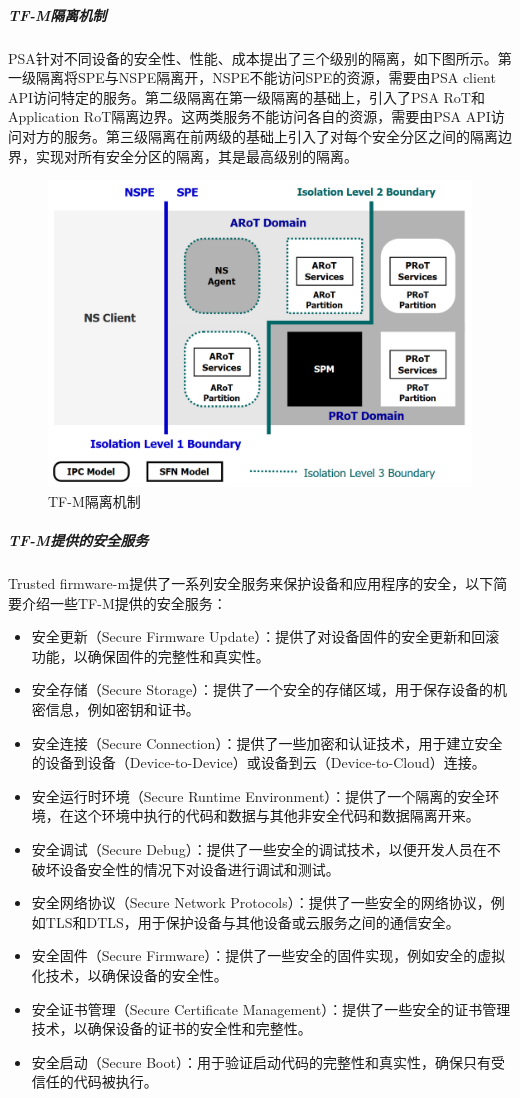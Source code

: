 \documentclass[12pt,a4paper]{ctexart}
\numberwithin{figure}{section}
\begin{document}
\subparagraph{TF-M隔离机制}
\par PSA针对不同设备的安全性、性能、成本提出了三个级别的隔离，如下图所示。第一级隔离将SPE与NSPE隔离开，NSPE不能访问SPE的资源，需要由PSA client API访问特定的服务。第二级隔离在第一级隔离的基础上，引入了PSA RoT和Application RoT隔离边界。这两类服务不能访问各自的资源，需要由PSA API访问对方的服务。第三级隔离在前两级的基础上引入了对每个安全分区之间的隔离边界，实现对所有安全分区的隔离，其是最高级别的隔离。
\begin{figure}
    \centering
    \includegraphics[scale=0.27]{graph/isolation.png}
    \caption{TF-M隔离机制}
\end{figure}
\subparagraph{TF-M提供的安全服务}
\par Trusted firmware-m提供了一系列安全服务来保护设备和应用程序的安全，以下简要介绍一些TF-M提供的安全服务：
\begin{itemize}
    \item 安全更新（Secure Firmware Update）：提供了对设备固件的安全更新和回滚功能，以确保固件的完整性和真实性。
    \item 安全存储（Secure Storage）：提供了一个安全的存储区域，用于保存设备的机密信息，例如密钥和证书。
    \item 安全连接（Secure Connection）：提供了一些加密和认证技术，用于建立安全的设备到设备（Device-to-Device）或设备到云（Device-to-Cloud）连接。
    \item 安全运行时环境（Secure Runtime Environment）：提供了一个隔离的安全环境，在这个环境中执行的代码和数据与其他非安全代码和数据隔离开来。
    \item 安全调试（Secure Debug）：提供了一些安全的调试技术，以便开发人员在不破坏设备安全性的情况下对设备进行调试和测试。
    \item 安全网络协议（Secure Network Protocols）：提供了一些安全的网络协议，例如TLS和DTLS，用于保护设备与其他设备或云服务之间的通信安全。
    \item 安全固件（Secure Firmware）：提供了一些安全的固件实现，例如安全的虚拟化技术，以确保设备的安全性。
    \item 安全证书管理（Secure Certificate Management）：提供了一些安全的证书管理技术，以确保设备的证书的安全性和完整性。
    \item  安全启动（Secure Boot）：用于验证启动代码的完整性和真实性，确保只有受信任的代码被执行。
\end{itemize}
\end{document}
